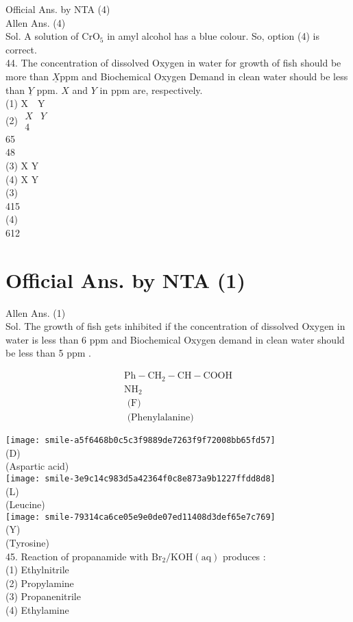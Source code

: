 \documentclass[10pt]{article}
\begin{document}
Official Ans. by NTA (4)\\
Allen Ans. (4)\\
Sol. A solution of \(\mathrm{CrO}_{5}\) in amyl alcohol has a blue colour. So, option (4) is correct.\\
44. The concentration of dissolved Oxygen in water for growth of fish should be more than \(\underline{X} \mathrm{ppm}\) and Biochemical Oxygen Demand in clean water should be less than \(\underline{Y}\) ppm. \(X\) and \(Y\) in ppm are, respectively.\\
(1) \(\mathrm{X} \quad \mathrm{Y}\)\\
(2) \(\begin{array}{ll}X & Y \\ 4 & \end{array}\)\\
65\\
48\\
(3) X Y\\
(4) X Y\\
(3)\\
415\\
(4)\\
612

\section*{Official Ans. by NTA (1)}
Allen Ans. (1)\\
Sol. The growth of fish gets inhibited if the concentration of dissolved Oxygen in water is less than 6 ppm and Biochemical Oxygen demand in clean water should be less than 5 ppm .

\[
\begin{gathered}
\mathrm{Ph}-\mathrm{CH}_{2}-\mathrm{CH}-\mathrm{COOH} \\
\mathrm{NH}_{2} \\
\text { (F) } \\
\text { (Phenylalanine) }
\end{gathered}
\]

\texttt{[image: smile-a5f6468b0c5c3f9889de7263f9f72008bb65fd57]}\\
(D)\\
(Aspartic acid)\\
\texttt{[image: smile-3e9c14c983d5a42364f0c8e873a9b1227ffdd8d8]}\\
(L)\\
(Leucine)\\
\texttt{[image: smile-79314ca6ce05e9e0de07ed11408d3def65e7c769]}\\
(Y)\\
(Tyrosine)\\
45. Reaction of propanamide with \(\mathrm{Br}_{2} / \mathrm{KOH}(\mathrm{aq})\) produces :\\
(1) Ethylnitrile\\
(2) Propylamine\\
(3) Propanenitrile\\
(4) Ethylamine
\end{document}
